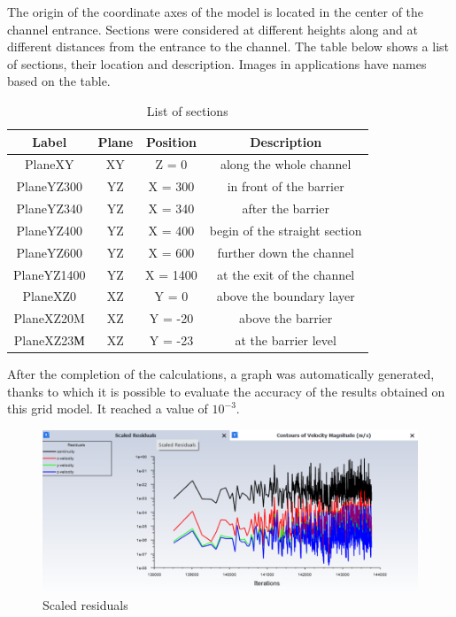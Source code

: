 	The origin of the coordinate axes of the model is located in the center of the channel entrance. Sections were considered at different heights along and at different distances from the entrance to the channel. The table below shows a list of sections, their location and description. Images in applications have names based on the table.
	\begin{table}[H]
		\begin{center}
			\begin{tabular}{|c|c|c|c|}
				\hline
				Label & Plane & Position & Description\\
				\hline
				PlaneXY & XY & Z = 0 & along the whole channel\\
				\hline
				PlaneYZ300 & YZ & X = 300 & in front of the barrier\\
				\hline
				PlaneYZ340 & YZ & X = 340 & after the barrier\\
				\hline
				PlaneYZ400 & YZ & X = 400 & begin of the straight section\\
				\hline
				PlaneYZ600 & YZ & X = 600 & further down the channel\\
				\hline
				PlaneYZ1400 & YZ & X = 1400 & at the exit of the channel\\
				\hline
				PlaneXZ0 & XZ & Y = 0 & above the boundary layer\\
				\hline
				PlaneXZ20M & XZ & Y = -20 & above the barrier\\
				\hline
				PlaneXZ23М & XZ & Y = -23 & at the barrier level\\
				\hline
			\end{tabular}
		\end{center}
		\label{tbl:sections}
		\caption{List of sections}
	\end{table}
	
	After the completion of the calculations, a graph was automatically generated, thanks to which it is possible to evaluate the accuracy of the results obtained on this grid model. It reached a value of $10^{-3}$.
	\begin{figure}[H]
		\centering
		\includegraphics[width=1\linewidth]{../Assets/scaledResiduals}
		\caption{Scaled residuals}
		\label{fig:scaledresiduals}
	\end{figure}
